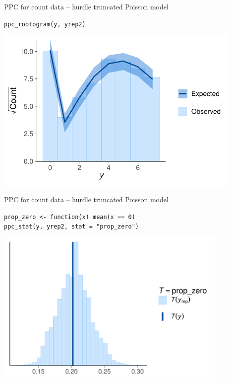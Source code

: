 \documentclass[t]{beamer}
\begin{document}
\begin{frame}{PPC for count data -- hurdle truncated Poisson model}
  
  \vspace{-1\baselineskip}
  \texttt{ppc\_rootogram(y, yrep2)}

    \includegraphics[height=8cm]{poisson2_ppc_rootogram.pdf}

\end{frame}

\begin{frame}{PPC for count data -- hurdle truncated Poisson model}
  
  \vspace{-1\baselineskip}
  \texttt{prop\_zero <- function(x) mean(x == 0)}\\
  \texttt{ppc\_stat(y, yrep2, stat = "prop\_zero")}

    \includegraphics[height=7.5cm]{poisson2_ppc_stat_propzero.pdf}

\end{frame}
\end{document}
